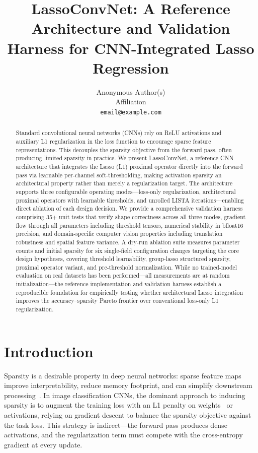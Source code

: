 \documentclass{article}
\title{LassoConvNet: A Reference Architecture and Validation Harness for
       CNN-Integrated Lasso Regression}
\author{Anonymous Author(s)\\
  Affiliation\\
  \texttt{email@example.com}
}
\begin{document}
\maketitle

\begin{abstract}
Standard convolutional neural networks (CNNs) rely on ReLU activations and
auxiliary L1 regularization in the loss function to encourage sparse feature
representations. This decouples the sparsity objective from the forward pass,
often producing limited sparsity in practice. We present LassoConvNet, a
reference CNN architecture that integrates the Lasso (L1) proximal operator
directly into the forward pass via learnable per-channel soft-thresholding,
making activation sparsity an architectural property rather than merely a
regularization target. The architecture supports three configurable operating
modes---loss-only regularization, architectural proximal operators with
learnable thresholds, and unrolled LISTA iterations---enabling direct ablation
of each design decision. We provide a comprehensive validation harness
comprising 35+ unit tests that verify shape correctness across all three modes,
gradient flow through all parameters including threshold tensors, numerical
stability in bfloat16 precision, and domain-specific computer vision properties
including translation robustness and spatial feature variance. A dry-run
ablation suite measures parameter counts and initial sparsity for six
single-field configuration changes targeting the core design hypotheses,
covering threshold learnability, group-lasso structured sparsity, proximal
operator variant, and pre-threshold normalization. While no trained-model
evaluation on real datasets has been performed---all measurements are at
random initialization---the reference implementation and validation harness
establish a reproducible foundation for empirically testing whether
architectural Lasso integration improves the accuracy--sparsity Pareto
frontier over conventional loss-only L1 regularization.
\end{abstract}

\section{Introduction}

Sparsity is a desirable property in deep neural networks: sparse feature maps
improve interpretability, reduce memory footprint, and can simplify downstream
processing~\cite{louizos2018learning, gale2019state}. In image classification
CNNs, the dominant approach to inducing sparsity is to augment the training loss
with an L1 penalty on weights~\cite{han2015learning} or activations, relying on
gradient descent to balance the sparsity objective against the task loss. This
strategy is indirect---the forward pass produces dense activations, and the
regularization term must compete with the cross-entropy gradient at every update.
\end{document}

